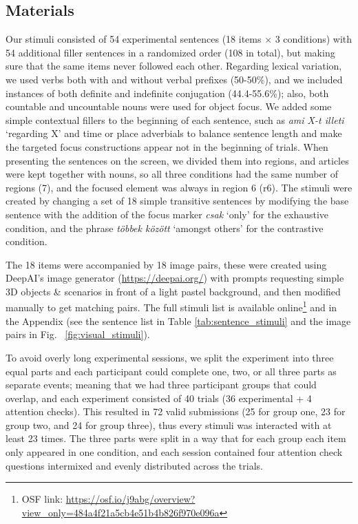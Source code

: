 \documentclass[ruler]{CUP-JNL-LIN}%
\begin{document}
\subsection{Materials}


Our stimuli consisted of 54 experimental sentences (18 items × 3 conditions) with 54 additional filler sentences in a randomized order (108 in total), but making sure that the same items never followed each other. Regarding lexical variation, we used verbs both with and without verbal prefixes (50-50\%), and we included instances of both definite and indefinite conjugation (44.4-55.6\%); also, both countable and uncountable nouns were used for object focus. We added some simple contextual fillers to the beginning of each sentence, such as \textit{ami X-t illeti} `regarding X' and time or place adverbials to balance sentence length and make the targeted focus constructions appear not in the beginning of trials. When presenting the sentences on the screen, we divided them into regions, and articles were kept together with nouns, so all three conditions had the same number of regions (7), and the focused element was always in region 6 (r6). The stimuli were created by changing a set of 18 simple transitive sentences by modifying the base sentence with the addition of the focus marker \textit{csak} `only' for the exhaustive condition, and the phrase \textit{többek között} `amongst others' for the contrastive condition.

The 18 items were accompanied by 18 image pairs, these were created using DeepAI's image generator (\url{https://deepai.org/}) with prompts requesting simple 3D objects \& scenarios in front of a light pastel background, and then modified manually to get matching pairs. The full stimuli list is available online\footnote{OSF link: \href{https://osf.io/j9abg/overview?view_only=484a4f21a5cb4e51b4b826f970e096a0}{\url{https://osf.io/j9abg/overview?view_only=484a4f21a5cb4e51b4b826f970e096a}}} and in the Appendix (see the sentence list in Table \ref{tab:sentence_stimuli} and the image pairs in Fig. ~\ref{fig:visual_stimuli}). 

To avoid overly long experimental sessions, we split the experiment into three equal parts and each participant could complete one, two, or all three parts as separate events; meaning that we had three participant groups that could overlap, and each experiment consisted of 40 trials (36 experimental + 4 attention checks). This resulted in 72 valid  submissions (25 for group one, 23 for group two, and 24 for group three), thus every stimuli was interacted with at least 23 times. The three parts were split in a way that for each group each item only appeared in one condition, and each session contained four attention check questions intermixed and evenly distributed across the trials. 
\end{document}
